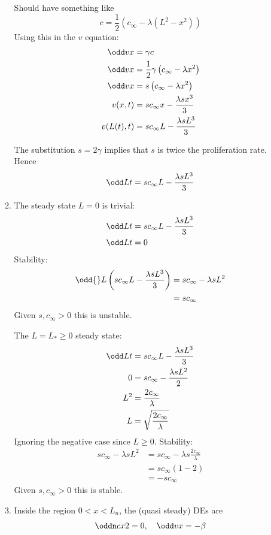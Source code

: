 \documentclass{X:/Documents/Coding/Latex/myassignment}
\begin{document}
\begin{enumerate}
\begin{enumerate}
		Should have something like
		\[c = \frac12 \left(c_\infty - \lambda (L^2 - x^2)\right)\]
		Using this in the $v$ equation:
		\begin{align*}
			\odd vx &= \gamma c\\
			\odd vx &= \frac12\gamma \left(c_\infty - \lambda  x^2\right)\\
			\odd vx &= s\left(c_\infty - \lambda  x^2\right)\\
			v(x,t) &= sc_\infty x - \frac{\lambda s x^3}{3}\\
			v(L(t),t) &= sc_\infty L - \frac{\lambda s L^3}{3}
		\end{align*}

		The substitution $s = 2 \gamma$ implies that $s$ is twice the proliferation rate.
		Hence
		\[\odd Lt = s c_\infty L - \frac{\lambda s L^3}{3}\]

		\item The steady state $L=0$ is trivial:
		\begin{align*}
			\odd Lt &= s c_\infty L - \frac{\lambda s L^3}{3}\\
			\odd Lt &= 0 
		\end{align*}
		Stability:
		\begin{align*}
			\odd{}L\left(s c_\infty L - \frac{\lambda s L^3}{3}\right) &= s  c_\infty - \lambda s L^2\\
			&= s c_\infty
		\end{align*}
		Given $s, c_\infty > 0$ this is unstable.



		The $L = L_* \geq 0$ steady state:
		\begin{align*}
			\odd Lt &=s c_\infty L - \frac{\lambda s L^3}{3}\\
			0 &= s c_\infty - \frac{\lambda s L^2}{2}\\
			L^2 &= \frac{2 c_\infty }{\lambda}\\
			L &= \sqrt{\frac{2 c_\infty }{\lambda}}\\
		\end{align*}
		Ignoring the negative case since $L \geq 0$.
		Stability:
		\begin{align*}
			s  c_\infty - \lambda s L^2  &= s  c_\infty - \lambda s \frac{2 c_\infty }{\lambda}\\
			&= s c_\infty \left(1 - 2\right)\\
			&= - s c_\infty
		\end{align*}
		Given $s,c_\infty > 0 $ this is stable.


		\item 
		Inside the region $0 < x < L_n$, the (quasi steady) DEs are
		\[ \oddn cx2 = 0, \quad \odd vx = - \beta\]


\end{enumerate}
\end{enumerate}
\end{document}
